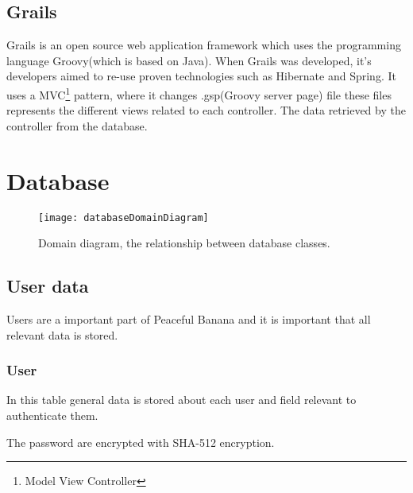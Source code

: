 \subsection{Grails}
Grails is an open source web application framework which uses the programming language Groovy(which is based on Java). When Grails was developed, it's developers aimed to re-use proven technologies such as Hibernate and Spring. It uses a MVC\footnote{Model View Controller} pattern, where it changes .gsp(Groovy server page) file these files represents the different views related to each controller. The data retrieved by the controller from the database.

\section{Database}
\begin{figure}[h!]
\label{newnotification}
\centering
	\texttt{[image: databaseDomainDiagram]}
\caption{Domain diagram, the relationship between database classes.}
\end{figure}

\subsection{User data}
Users are a important part of Peaceful Banana and it is important that all relevant data is stored. \\

\subsubsection*{User}
In this table general data is stored about each user and field relevant to authenticate them.

The password are encrypted with SHA-512 encryption.\\


